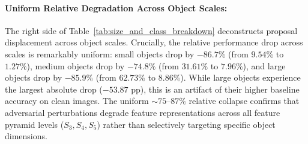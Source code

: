 \documentclass[preprint,12pt]{elsarticle}
\begin{document}
\begin{table}[!htbp]
\centering
\caption{Cross-class fabrication generalization and foreground object size eviction breakdown under baseline DQF ($\epsilon=16/255, T=8$ across the official COCO \texttt{val2017} cohort at native $640\times 640$). Left: fabrication efficacy across representative safety-critical target classes. Right: breakdown of foreground proposal displacement by ground-truth bounding box area (small, medium, large).}
\label{tab:size_and_class_breakdown}
\renewcommand{\arraystretch}{1.15}
\end{table}

\paragraph{Uniform Relative Degradation Across Object Scales:}
The right side of Table~\ref{tab:size_and_class_breakdown} deconstructs proposal displacement across object scales. Crucially, the relative performance drop across scales is remarkably uniform: small objects drop by $-86.7\%$ (from $9.54\%$ to $1.27\%$), medium objects drop by $-74.8\%$ (from $31.61\%$ to $7.96\%$), and large objects drop by $-85.9\%$ (from $62.73\%$ to $8.86\%$). While large objects experience the largest absolute drop ($-53.87\text{ pp}$), this is an artifact of their higher baseline accuracy on clean images. The uniform $\sim 75\text{--}87\%$ relative collapse confirms that adversarial perturbations degrade feature representations across all feature pyramid levels ($S_3, S_4, S_5$) rather than selectively targeting specific object dimensions.
\end{document}
